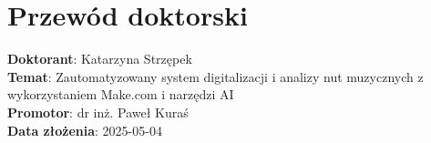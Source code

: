\documentclass{article}
\begin{document}
            \section*{Przewód doktorski}

            \textbf{Doktorant}: Katarzyna Strzępek \\
            \textbf{Temat}: Zautomatyzowany system digitalizacji i analizy nut muzycznych z wykorzystaniem Make.com i narzędzi AI \\
            \textbf{Promotor}: dr inż. Paweł Kuraś \\
            \textbf{Data złożenia}: 2025-05-04

            
\end{document}
